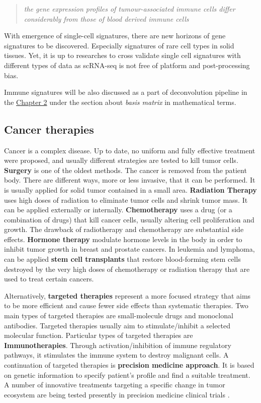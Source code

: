 \documentclass[12pt,]{book}
\theoremstyle{definition}
\theoremstyle{definition}
\theoremstyle{definition}
\theoremstyle{remark}
\begin{document}
\begin{quote}
\emph{the gene expression profiles of tumour-associated immune cells
differ considerably from those of blood derived immune cells}
\citep{Schelker2017}
\end{quote}

With emergence of single-cell signatures, there are new horizons of gene
signatures to be discovered. Especially signatures of rare cell types in
solid tissues. Yet, it is up to researches to cross validate single cell
signatures with different types of data as scRNA-seq is not free of
platform and post-processing bias.

Immune signatures will be also discussed as a part of deconvolution
pipeline in the \protect\hyperlink{methods}{Chapter 2} under the section
about \emph{basis matrix} in mathematical terms.

\hypertarget{cancer_Therapies}{%
\subsection{Cancer therapies}\label{cancer_Therapies}}

Cancer is a complex disease. Up to date, no uniform and fully effective
treatment were proposed, and usually different strategies are tested to
kill tumor cells. \textbf{Surgery} is one of the oldest methods. The
cancer is removed from the patient body. There are different ways, more
or less invasive, that it can be performed. It is usually applied for
solid tumor contained in a small area. \textbf{Radiation Therapy} uses
high doses of radiation to eliminate tumor cells and shrink tumor mass.
It can be applied externally or internally. \textbf{Chemotherapy} uses a
drug (or a combination of drugs) that kill cancer cells, usually
altering cell proliferation and growth. The drawback of radiotherapy and
chemotherapy are substantial side effects. \textbf{Hormone therapy }
modulate hormone levels in the body in order to inhibit tumor growth in
breast and prostate cancers. In leukemia and lymphoma, can be applied
\textbf{stem cell transplants} that restore blood-forming stem cells
destroyed by the very high doses of chemotherapy or radiation therapy
that are used to treat certain cancers.

Alternatively, \textbf{targeted therapies} represent a more focused
strategy that aims to be more efficient and cause fewer side effects
than systematic therapies. Two main types of targeted therapies are
small-molecule drugs and monoclonal antibodies. Targeted therapies
usually aim to stimulate/inhibit a selected molecular function.
Particular types of targeted therapies are \textbf{Immunotherapies}.
Through activation/inhibition of immune regulatory pathways, it
stimulates the immune system to destroy malignant cells. A continuation
of targeted therapies is \textbf{precision medicine approach}. It is
based on genetic information to specify patient's profile and find a
suitable treatment. A number of innovative treatments targeting a
specific change in tumor ecosystem are being tested presently in
precision medicine clinical trials \citep{NCI2018}.
\end{document}
